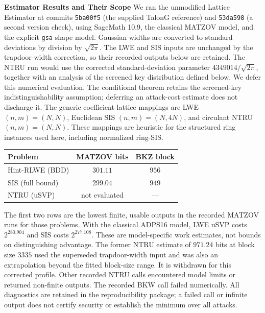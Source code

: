 \documentclass[lettersize,journal]{IEEEtran}
\newcommand{\parab}[1]{\noindent\textbf{#1} }
\begin{document}
	\parab{Estimator Results and Their Scope}
	We ran the unmodified Lattice Estimator at commits
	\texttt{5ba00f5} (the supplied TalonG reference) and
	\texttt{53da598} (a second version check), using SageMath 10.9,
	the classical MATZOV model, and the explicit \texttt{gsa} shape model.
	Gaussian widths are converted to standard deviations by division by
	$\sqrt{2\pi}$.
	The LWE and SIS inputs are unchanged by the trapdoor-width
	correction, so their recorded outputs below are retained. The NTRU run
	would use the corrected standard-deviation parameter
	$4349014/\sqrt{2\pi}$, together with an analysis of the screened key
	distribution defined below. We defer this numerical evaluation. The
	conditional theorem retains the screened-key indistinguishability
	assumption; deferring an attack-cost estimate does not discharge it.
	The generic coefficient-lattice mappings are
	LWE $(n,m)=(N,N)$, Euclidean SIS $(n,m)=(N,4N)$, and circulant
	NTRU $(n,m)=(N,N)$. These mappings are heuristic for the structured ring
	instances used here, including normalized ring-SIS.
	\begin{center}
		\small
		\begin{tabular}{lcc}
			\hline
			Problem & MATZOV bits & BKZ block\\
			\hline
			Hint-RLWE (BDD) & $301.11$ & $956$\\
			SIS (full bound) & $299.04$ & $949$\\
			NTRU (uSVP) & not evaluated & ---\\
			\hline
		\end{tabular}
	\end{center}
	The first two rows are the lowest finite, usable outputs in the recorded
	MATZOV runs for those problems. With the classical ADPS16 model,
	LWE uSVP costs $2^{280.904}$ and SIS costs $2^{277.108}$.
	These are model-specific work estimates, not bounds on distinguishing
	advantage.
	The former NTRU estimate of $971.24$ bits at block size $3335$
	used the superseded trapdoor-width input and was also an extrapolation
	beyond the fitted block-size range. It is withdrawn for this corrected
	profile. Other recorded NTRU calls encountered model limits or returned
	non-finite outputs.
	The recorded BKW call failed numerically. All diagnostics are retained in the
	reproducibility package; a failed call or infinite output does not certify
	security or establish the minimum over all attacks.
	
\end{document}
